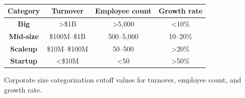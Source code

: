\documentclass{article}
\begin{document}
\begin{table} %
    \vspace{-20pt} %
    \setlength{\tabcolsep}{3pt} %
    \centering
    \begin{tabular}{|c|c|c|c|}
        \hline
        \textbf{Category} & \textbf{Turnover}  & \textbf{Employee count} & \textbf{Growth rate} \\ \hline
        \textbf{Big}      & \textgreater{}\$1B & \textgreater{}5,000     & \textless{}10\%      \\ \hline
        \textbf{Mid-size} & \$100M–\$1B        & 500–5,000               & 10–20\%              \\ \hline
        \textbf{Scaleup}  & \$10M–\$100M       & 50–500                  & \textgreater{}20\%   \\ \hline
        \textbf{Startup}  & \textless{}\$10M   & \textless{}50           & \textgreater{}50\%   \\ \hline
    \end{tabular}
    
    \captionsetup{skip=2pt} %
    \caption{\hspace{1mm}Corporate size categorization cutoff values for turnover, employee count, and growth rate.}
    \vspace{-7pt} %
    \caption*{} %
    \label{tab:corporate_size}
    \vspace{-5pt} %
\end{table}
\end{document}
